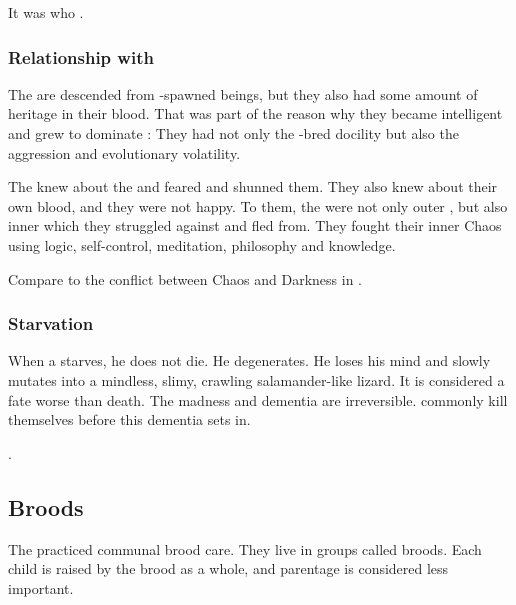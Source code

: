 It was \Sethicus who . 





\subsubsection{Relationship with \XzaiShanns}
The \ophidians{} are descended from \voyager-spawned beings, but they also had some amount of \xsic{} heritage in their blood. 
That was part of the reason why they became intelligent and grew to dominate \Miith{}: 
They had not only the \voyager-bred docility but also the \xsic{} aggression and evolutionary volatility. 

The \ophidians{} knew about the \xss{} and feared and shunned them. 
They also knew about their own \xsic{} blood, and they were not happy. 
To them, the \xss{} were not only outer \daemons, but also inner \daemons{} which they struggled against and fled from. 
They fought their inner Chaos using logic, self-control, meditation, philosophy and knowledge. 

Compare to the conflict between Chaos and Darkness in \cite{StevenEriksonIanCameronEsslemont:MalazanBookoftheFallen}. 





\subsubsection{Starvation}
When a \caisith starves, he does not die.
He degenerates.
He loses his mind and slowly mutates into a mindless, slimy, crawling salamander-like lizard. 
It is considered a fate worse than death.
The madness and dementia are irreversible. 
\Caisith commonly kill themselves before this dementia sets in. 

\Dragons {}.









\subsection{Broods}
The \caisith practiced communal brood care. They live in groups called broods. Each child is raised by the brood as a whole, and parentage is considered less important. 

